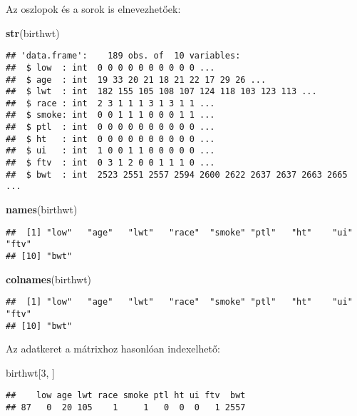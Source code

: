 \documentclass[
]{book}
\newenvironment{Shaded}{\begin{snugshade}}{\end{snugshade}}
\newcommand{\DecValTok}[1]{\textcolor[rgb]{0.00,0.00,0.81}{#1}}
\newcommand{\KeywordTok}[1]{\textcolor[rgb]{0.13,0.29,0.53}{\textbf{#1}}}
\newcommand{\NormalTok}[1]{#1}
\begin{document}
Az oszlopok és a sorok is elnevezhetőek:

\begin{Shaded}
\begin{Highlighting}[]
\KeywordTok{str}\NormalTok{(birthwt)}
\end{Highlighting}
\end{Shaded}

\begin{verbatim}
## 'data.frame':    189 obs. of  10 variables:
##  $ low  : int  0 0 0 0 0 0 0 0 0 0 ...
##  $ age  : int  19 33 20 21 18 21 22 17 29 26 ...
##  $ lwt  : int  182 155 105 108 107 124 118 103 123 113 ...
##  $ race : int  2 3 1 1 1 3 1 3 1 1 ...
##  $ smoke: int  0 0 1 1 1 0 0 0 1 1 ...
##  $ ptl  : int  0 0 0 0 0 0 0 0 0 0 ...
##  $ ht   : int  0 0 0 0 0 0 0 0 0 0 ...
##  $ ui   : int  1 0 0 1 1 0 0 0 0 0 ...
##  $ ftv  : int  0 3 1 2 0 0 1 1 1 0 ...
##  $ bwt  : int  2523 2551 2557 2594 2600 2622 2637 2637 2663 2665 ...
\end{verbatim}

\begin{Shaded}
\begin{Highlighting}[]
\KeywordTok{names}\NormalTok{(birthwt)}
\end{Highlighting}
\end{Shaded}

\begin{verbatim}
##  [1] "low"   "age"   "lwt"   "race"  "smoke" "ptl"   "ht"    "ui"    "ftv"  
## [10] "bwt"
\end{verbatim}

\begin{Shaded}
\begin{Highlighting}[]
\KeywordTok{colnames}\NormalTok{(birthwt)}
\end{Highlighting}
\end{Shaded}

\begin{verbatim}
##  [1] "low"   "age"   "lwt"   "race"  "smoke" "ptl"   "ht"    "ui"    "ftv"  
## [10] "bwt"
\end{verbatim}

Az adatkeret a mátrixhoz hasonlóan indexelhető:

\begin{Shaded}
\begin{Highlighting}[]
\NormalTok{birthwt[}\DecValTok{3}\NormalTok{, ]}
\end{Highlighting}
\end{Shaded}

\begin{verbatim}
##    low age lwt race smoke ptl ht ui ftv  bwt
## 87   0  20 105    1     1   0  0  0   1 2557
\end{verbatim}
\end{document}
